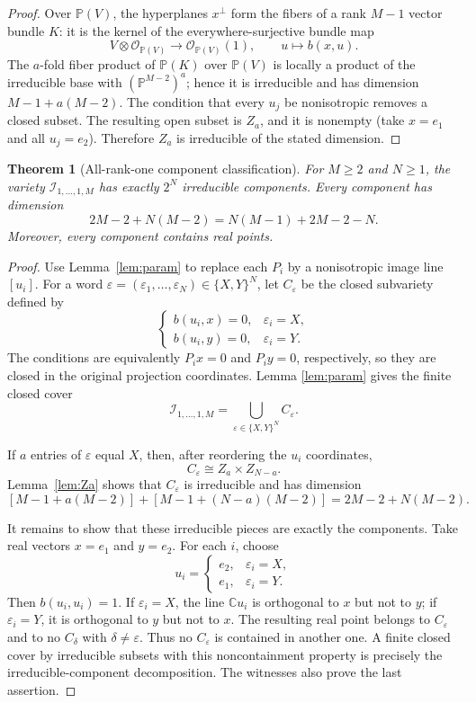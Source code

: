 \documentclass[11pt]{article}
\newtheorem{theorem}{Theorem}
\newcommand{\PP}{\mathbb P}
\newcommand{\CC}{\mathbb C}
\newcommand{\cI}{\mathcal I}
\begin{document}
\begin{proof}
Over $\PP(V)$, the hyperplanes $x^\perp$ form the fibers of a rank
$M-1$ vector bundle $K$: it is the kernel of the everywhere-surjective
bundle map
\[
 V\otimes\mathcal O_{\PP(V)}\longrightarrow\mathcal O_{\PP(V)}(1),
 \qquad u\longmapsto b(x,u).
\]
The $a$-fold fiber product of $\PP(K)$ over $\PP(V)$ is locally a product
of the irreducible base with $(\PP^{M-2})^a$; hence it is irreducible and
has dimension $M-1+a(M-2)$.  The condition that every $u_j$ be
nonisotropic removes a closed subset.  The resulting open subset is $Z_a$,
and it is nonempty (take $x=e_1$ and all $u_j=e_2$).  Therefore $Z_a$ is
irreducible of the stated dimension.
\end{proof}

\begin{theorem}[All-rank-one component classification]\label{thm:main}
For $M\geq2$ and $N\geq1$, the variety
$\cI_{1,\ldots,1,M}$ has exactly $2^N$ irreducible components.  Every
component has dimension
\[
 2M-2+N(M-2)
 =N(M-1)+2M-2-N.
\]
Moreover, every component contains real points.
\end{theorem}

\begin{proof}
Use Lemma~\ref{lem:param} to replace each $P_i$ by a nonisotropic image
line $[u_i]$.  For a word
$\varepsilon=(\varepsilon_1,\ldots,\varepsilon_N)\in\{X,Y\}^N$, let
$C_\varepsilon$ be the closed subvariety defined by
\[
 \begin{cases}
 b(u_i,x)=0,&\varepsilon_i=X,\\
 b(u_i,y)=0,&\varepsilon_i=Y.
 \end{cases}
\]
The conditions are equivalently $P_i x=0$ and $P_i y=0$, respectively,
so they are closed in the original projection coordinates.  Lemma
\ref{lem:param} gives the finite closed cover
\[
 \cI_{1,\ldots,1,M}=\bigcup_{\varepsilon\in\{X,Y\}^N}C_\varepsilon.
\]

If $a$ entries of $\varepsilon$ equal $X$, then, after reordering the
$u_i$ coordinates,
\[
 C_\varepsilon\cong Z_a\times Z_{N-a}.
\]
Lemma~\ref{lem:Za} shows that $C_\varepsilon$ is irreducible and has
dimension
\[
 [M-1+a(M-2)]+[M-1+(N-a)(M-2)]
 =2M-2+N(M-2).
\]

It remains to show that these irreducible pieces are exactly the components.
Take real vectors $x=e_1$ and $y=e_2$.  For each $i$, choose
\[
 u_i=\begin{cases}
 e_2,&\varepsilon_i=X,\\
 e_1,&\varepsilon_i=Y.
 \end{cases}
\]
Then $b(u_i,u_i)=1$.  If $\varepsilon_i=X$, the line $\CC u_i$ is
orthogonal to $x$ but not to $y$; if $\varepsilon_i=Y$, it is orthogonal
to $y$ but not to $x$.  The resulting real point belongs to
$C_\varepsilon$ and to no $C_\delta$ with $\delta\ne\varepsilon$.
Thus no $C_\varepsilon$ is contained in another one.  A finite closed
cover by irreducible subsets with this noncontainment property is precisely
the irreducible-component decomposition.  The witnesses also prove the last
assertion.
\end{proof}
\end{document}
